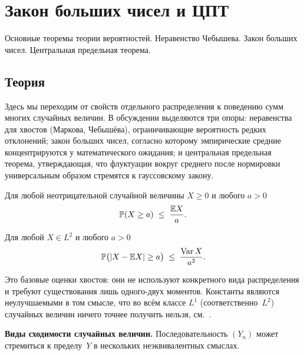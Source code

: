 
\section{Закон больших чисел и ЦПТ}
\label{sec:1.2.05-limit-theorems}

\begin{ticket}
Основные теоремы теории вероятностей. Неравенство Чебышева. Закон больших чисел. Центральная предельная теорема.
\end{ticket}

\subsection*{Теория}

Здесь мы переходим от свойств отдельного распределения к поведению сумм многих случайных величин. В обсуждении выделяются три опоры: неравенства для хвостов (Маркова, Чебышёва), ограничивающие вероятность редких отклонений; закон больших чисел, согласно которому эмпирические средние концентрируются у математического ожидания; и центральная предельная теорема, утверждающая, что флуктуации вокруг среднего после нормировки универсальным образом стремятся к гауссовскому закону.

\begin{theorem}
\label{thm:markov-ineq}
Для любой неотрицательной случайной величины $X \geq 0$ и любого $a > 0$
\[
  \mathbb{P}(X \geq a) \;\leq\; \frac{\mathbb{E} X}{a}.
\]
\end{theorem}

\begin{theorem}
\label{thm:chebyshev-ineq}
Для любой $X \in L^2$ и любого $a > 0$
\[
  \mathbb{P}\bigl(|X - \mathbb{E} X| \geq a\bigr) \;\leq\; \frac{\operatorname{Var} X}{a^2}.
\]
\end{theorem}

Это базовые оценки хвостов: они не используют конкретного вида распределения и требуют существования лишь одного-двух моментов. Константы являются неулучшаемыми в том смысле, что во всём классе $L^1$ (соответственно~$L^2$) случайных величин ничего точнее получить нельзя, см.~\cite[гл.~II, \S~1]{Shiryaev1989}.

\medskip
\noindent\textbf{Виды сходимости случайных величин.} Последовательность $(Y_n)$ может стремиться к пределу~$Y$ в нескольких неэквивалентных смыслах.

